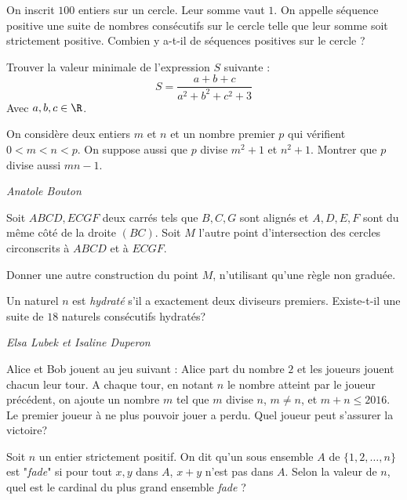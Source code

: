 \begin{exo}{}
On inscrit $100$ entiers sur un cercle. Leur somme vaut $1$. On appelle séquence positive une suite de nombres consécutifs sur le cercle telle que leur somme soit strictement positive. Combien y a-t-il de séquences positives sur le cercle ?
\end{exo}

\begin{exo}{}
Trouver la valeur minimale de l'expression $S$ suivante :
$$S=\dfrac{a+b+c}{a^2+b^2+c^2+3}$$
Avec $a,b,c\in \R$.
\end{exo}

\begin{exo}{}
On considère deux entiers $m$ et $n$ et un nombre premier $p$ qui vérifient $0<m<n<p$. On suppose aussi que $p$ divise $m^2+1$ et $n^2+1$. Montrer que $p$ divise aussi $mn-1$.

\medskip
\textit{Anatole Bouton}
\end{exo}

\begin{exo}{}
Soit $ABCD,ECGF$ deux carrés tels que $B,C,G$ sont alignés et $A,D,E,F$ sont
du même côté de la droite $(BC)$. Soit $M$ l'autre point d'intersection des cercles
circonscrits à $ABCD$ et à $ECGF$.

Donner une autre construction du point $M$, n'utilisant qu'une règle non graduée.
\end{exo}



\begin{exo}{}
Un naturel $n$ est \emph{hydraté} s'il a exactement deux diviseurs premiers. Existe-t-il une suite de $18$ naturels consécutifs hydratés?

\medskip
\textit{Elsa Lubek et Isaline Duperon}
\end{exo}


\begin{exo}{}
Alice et Bob jouent au jeu suivant :
Alice part du nombre $2$ et les joueurs jouent chacun leur tour.
A chaque tour, en notant $n$ le nombre atteint par le joueur précédent, on ajoute un nombre $m$ tel que $m$ divise $n$, $m \neq n$, et $m+n \leq 2016$.
Le premier joueur à ne plus pouvoir jouer a perdu.
Quel joueur peut s'assurer la victoire?
\end{exo}


\begin{exo}{}
Soit $n$ un entier strictement positif. On dit qu'un sous ensemble $A$ de $\{1,2,\dots,n\}$ est "\textit{fade}" si pour tout $x,y$ dans $A$, $x+y$ n'est pas dans $A$. Selon la valeur de $n$, quel est le cardinal du plus grand ensemble \textit{fade} ?
\end{exo}


